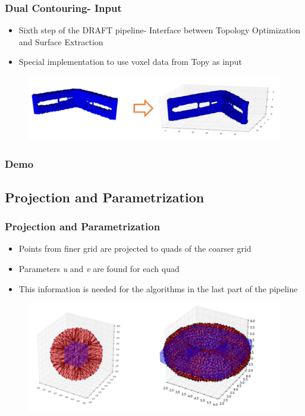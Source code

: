 \begin{frame}

	\frametitle{Dual Contouring- Input}
	
	\begin{itemize}
	\item  Sixth step of the DRAFT pipeline- Interface between Topology Optimization and Surface Extraction
	\item Special implementation to use voxel data from Topy as input
	\end{itemize}
	\begin{figure}
	\includegraphics[scale=0.35]{Pictures/DC/cantilever.pdf}
	\end{figure}
	
\end{frame}

\begin{frame}

	\frametitle{Demo}
	

\end{frame}

\subsection{Projection and Parametrization}

\begin{frame}

	\frametitle{Projection and Parametrization}
	
	\begin{itemize}
	\item Points from finer grid are projected to quads of the coarser grid 
	\item Parameters \textit{u} and \textit{v} are found for each quad
	\item This information is needed for the algorithms in the last part of the pipeline
	\end{itemize}
	\begin{figure}
	\includegraphics[scale=0.35]{Pictures/DC/projections.pdf}
	\end{figure}
	
\end{frame}





